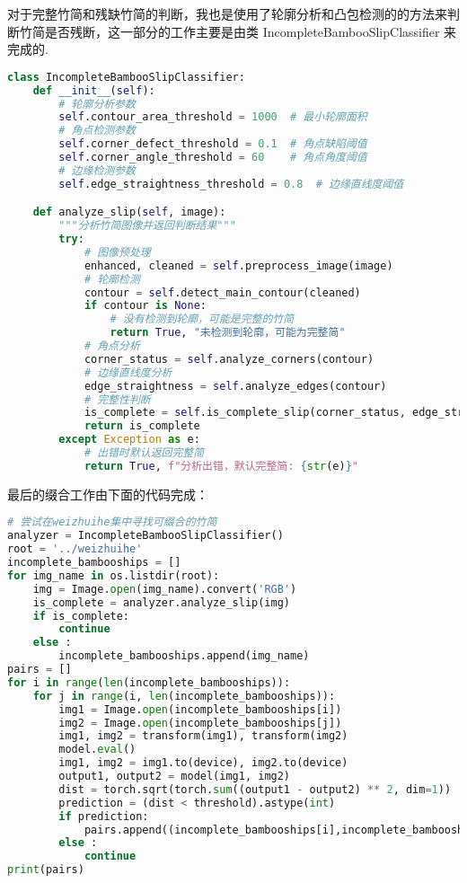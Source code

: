 \documentclass{article}
\begin{document}
对于完整竹简和残缺竹简的判断，我也是使用了轮廓分析和凸包检测的的方法来判断竹简是否残断，这一部分的工作主要是由类 IncompleteBambooSlipClassifier 来完成的.
\begin{lstlisting}[language=Python]
class IncompleteBambooSlipClassifier:
    def __init__(self):
        # 轮廓分析参数
        self.contour_area_threshold = 1000  # 最小轮廓面积
        # 角点检测参数
        self.corner_defect_threshold = 0.1  # 角点缺陷阈值
        self.corner_angle_threshold = 60    # 角点角度阈值
        # 边缘检测参数
        self.edge_straightness_threshold = 0.8  # 边缘直线度阈值

    def analyze_slip(self, image):
        """分析竹简图像并返回判断结果"""
        try:
            # 图像预处理
            enhanced, cleaned = self.preprocess_image(image)
            # 轮廓检测
            contour = self.detect_main_contour(cleaned)
            if contour is None:
                # 没有检测到轮廓，可能是完整的竹简
                return True, "未检测到轮廓，可能为完整简"
            # 角点分析
            corner_status = self.analyze_corners(contour)
            # 边缘直线度分析
            edge_straightness = self.analyze_edges(contour)
            # 完整性判断
            is_complete = self.is_complete_slip(corner_status, edge_straightness)
            return is_complete
        except Exception as e:
            # 出错时默认返回完整简
            return True, f"分析出错，默认完整简: {str(e)}"
\end{lstlisting}

最后的缀合工作由下面的代码完成：
\begin{lstlisting}[language=Python]
# 尝试在weizhuihe集中寻找可缀合的竹简
analyzer = IncompleteBambooSlipClassifier()
root = '../weizhuihe'
incomplete_bambooships = []
for img_name in os.listdir(root):
    img = Image.open(img_name).convert('RGB')
    is_complete = analyzer.analyze_slip(img)
    if is_complete:
        continue
    else :
        incomplete_bambooships.append(img_name)
pairs = []
for i in range(len(incomplete_bambooships)):
    for j in range(i, len(incomplete_bambooships)):
        img1 = Image.open(incomplete_bambooships[i])
        img2 = Image.open(incomplete_bambooships[j])
        img1, img2 = transform(img1), transform(img2)
        model.eval()
        img1, img2 = img1.to(device), img2.to(device)
        output1, output2 = model(img1, img2)
        dist = torch.sqrt(torch.sum((output1 - output2) ** 2, dim=1))
        prediction = (dist < threshold).astype(int)
        if prediction:
            pairs.append((incomplete_bambooships[i],incomplete_bambooships[j]))
        else :
            continue
print(pairs)
\end{lstlisting}
\end{document}
